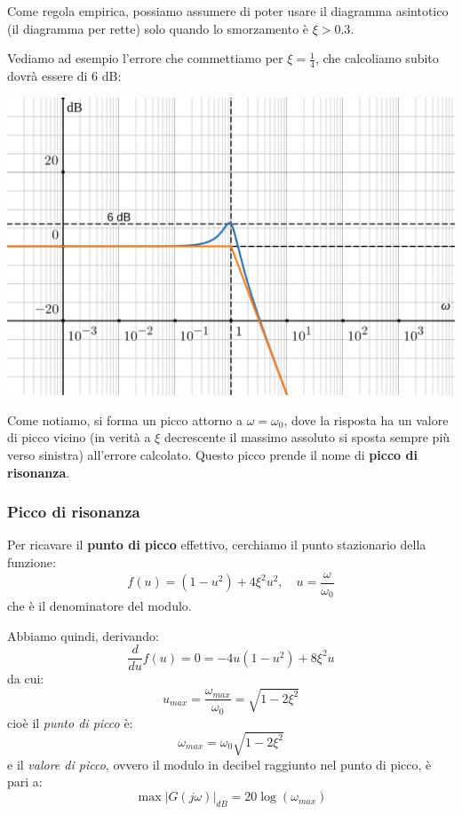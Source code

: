 \documentclass[a4paper,11pt]{article}
\begin{document}
Come regola empirica, possiamo assumere di poter usare il diagramma asintotico (il diagramma per rette) solo quando lo smorzamento è $\xi > 0.3$.

\par\medskip

\noindent
\begin{minipage}{\textwidth}
Vediamo ad esempio l'errore che commettiamo per $\xi = \frac{1}{4}$, che calcoliamo subito dovrà essere di 6 dB:

\begin{center}
	\includegraphics[scale=0.3]{../figures/order2_bode/reso_025_mod.png}
\end{center}
\end{minipage}

\par\medskip

Come notiamo, si forma un picco attorno a $\omega = \omega_0$, dove la risposta ha un valore di picco vicino (in verità a $\xi$ decrescente il massimo assoluto si sposta sempre più verso sinistra) all'errore calcolato.
Questo picco prende il nome di \textbf{picco di risonanza}.

\subsubsection{Picco di risonanza}
Per ricavare il \textbf{punto di picco} effettivo, cerchiamo il punto stazionario della funzione:
$$
f(u) = (1 - u^2) + 4 \xi^2 u^2, \quad u= \frac{\omega}{\omega_0}
$$
che è il denominatore del modulo.

Abbiamo quindi, derivando:
$$
\frac{d}{du} f(u) = 0 = -4u(1 - u^2) + 8 \xi^2 u
$$
da cui:
$$
u_{max} = \frac{\omega_{max}}{\omega_0} = \sqrt{1 - 2 \xi^2}
$$
cioè il \textit{punto di picco} è:
$$
\omega_{max} = \omega_0 \sqrt{1 - 2 \xi^2} 
$$
e il \textit{valore di picco}, ovvero il modulo in decibel raggiunto nel punto di picco, è pari a:
$$
\max |G(j \omega)|_{dB} = 20 \log \left( \omega_{max} \right)
$$
\end{document}
